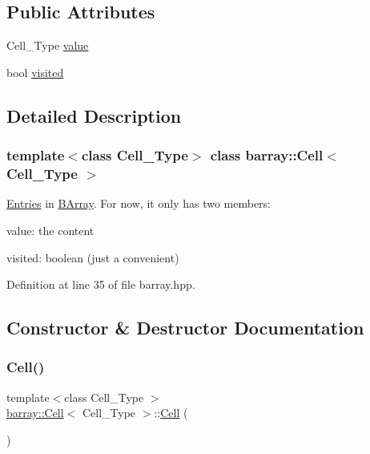 \subsection*{Public Attributes}
\begin{DoxyCompactItemize}
\item 
Cell\+\_\+\+Type \hyperlink{classbarray_1_1_cell_a186e7a58d801c8ff5837321937902f07}{value}
\item 
bool \hyperlink{classbarray_1_1_cell_a95b2d8e3135ef4b9cad82221c449c168}{visited}
\end{DoxyCompactItemize}


\subsection{Detailed Description}
\subsubsection*{template$<$class Cell\+\_\+\+Type$>$\newline
class barray\+::\+Cell$<$ Cell\+\_\+\+Type $>$}

\hyperlink{classbarray_1_1_entries}{Entries} in \hyperlink{classbarray_1_1_b_array}{B\+Array}. For now, it only has two members\+: 


\begin{DoxyItemize}
\item value\+: the content
\item visited\+: boolean (just a convenient) 
\end{DoxyItemize}

Definition at line 35 of file barray.\+hpp.



\subsection{Constructor \& Destructor Documentation}
\mbox{\label{classbarray_1_1_cell_acf29dd46bea3281d9749ee9db8b582a2}} 
\subsubsection{\texorpdfstring{Cell()}{Cell()}\hspace{0.1cm}{\footnotesize\ttfamily [1/6]}}
{\footnotesize\ttfamily template$<$class Cell\+\_\+\+Type $>$ \\
\hyperlink{classbarray_1_1_cell}{barray\+::\+Cell}$<$ Cell\+\_\+\+Type $>$\+::\hyperlink{classbarray_1_1_cell}{Cell} (\begin{DoxyParamCaption}{ }\end{DoxyParamCaption})}

